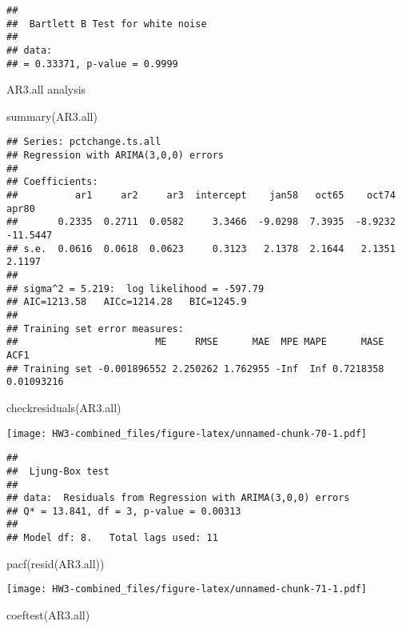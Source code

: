 \documentclass[
]{article}
\newenvironment{Shaded}{\begin{snugshade}}{\end{snugshade}}
\newcommand{\FunctionTok}[1]{\textcolor[rgb]{0.00,0.00,0.00}{#1}}
\newcommand{\NormalTok}[1]{#1}
\begin{document}
\begin{verbatim}
## 
##  Bartlett B Test for white noise
## 
## data:  
## = 0.33371, p-value = 0.9999
\end{verbatim}

AR3.all analysis

\begin{Shaded}
\begin{Highlighting}[]
\FunctionTok{summary}\NormalTok{(AR3.all)}
\end{Highlighting}
\end{Shaded}

\begin{verbatim}
## Series: pctchange.ts.all 
## Regression with ARIMA(3,0,0) errors 
## 
## Coefficients:
##          ar1     ar2     ar3  intercept    jan58   oct65    oct74     apr80
##       0.2335  0.2711  0.0582     3.3466  -9.0298  7.3935  -8.9232  -11.5447
## s.e.  0.0616  0.0618  0.0623     0.3123   2.1378  2.1644   2.1351    2.1197
## 
## sigma^2 = 5.219:  log likelihood = -597.79
## AIC=1213.58   AICc=1214.28   BIC=1245.9
## 
## Training set error measures:
##                        ME     RMSE      MAE  MPE MAPE      MASE       ACF1
## Training set -0.001896552 2.250262 1.762955 -Inf  Inf 0.7218358 0.01093216
\end{verbatim}

\begin{Shaded}
\begin{Highlighting}[]
\FunctionTok{checkresiduals}\NormalTok{(AR3.all)}
\end{Highlighting}
\end{Shaded}

\texttt{[image: HW3-combined\_files/figure-latex/unnamed-chunk-70-1.pdf]}

\begin{verbatim}
## 
##  Ljung-Box test
## 
## data:  Residuals from Regression with ARIMA(3,0,0) errors
## Q* = 13.841, df = 3, p-value = 0.00313
## 
## Model df: 8.   Total lags used: 11
\end{verbatim}

\begin{Shaded}
\begin{Highlighting}[]
\FunctionTok{pacf}\NormalTok{(}\FunctionTok{resid}\NormalTok{(AR3.all))}
\end{Highlighting}
\end{Shaded}

\texttt{[image: HW3-combined\_files/figure-latex/unnamed-chunk-71-1.pdf]}

\begin{Shaded}
\begin{Highlighting}[]
\FunctionTok{coeftest}\NormalTok{(AR3.all)}
\end{Highlighting}
\end{Shaded}
\end{document}
